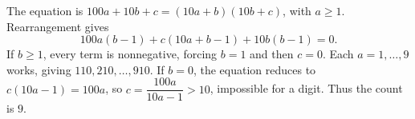 The equation is $100a+10b+c=(10a+b)(10b+c)$, with $a\ge1$. Rearrangement gives
\[100a(b-1)+c(10a+b-1)+10b(b-1)=0.\]
If $b\ge1$, every term is nonnegative, forcing $b=1$ and then $c=0$. Each $a=1,\ldots,9$ works, giving $110,210,\ldots,910$.
If $b=0$, the equation reduces to $c(10a-1)=100a$, so $c=\dfrac{100a}{10a-1}>10$, impossible for a digit. Thus the count is $\boxed9$.

